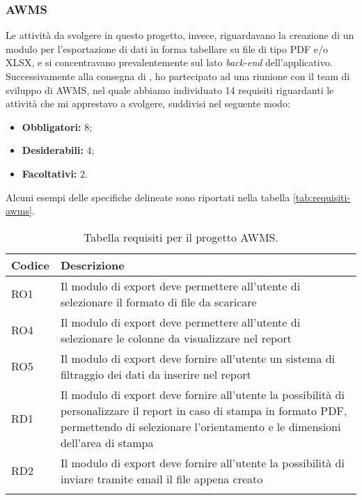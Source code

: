 \subsubsection*{AWMS}
Le attività da svolgere in questo progetto, invece, riguardavano la creazione di un modulo per l'esportazione di dati in forma tabellare su file di tipo PDF e/o XLSX, e si concentravano prevalentemente sul lato \textit{\gls{back-end}} dell'applicativo.
Successivamente alla consegna di \DS{}, ho partecipato ad una riunione con il team di sviluppo di AWMS, nel quale abbiamo individuato 14 requisiti riguardanti le attività che mi apprestavo a svolgere, suddivisi nel seguente modo:
\begin{itemize}
    \item \textbf{Obbligatori:} 8;
    \item \textbf{Desiderabili:} 4;
    \item \textbf{Facoltativi:} 2.
\end{itemize}
Alcuni esempi delle specifiche delineate sono riportati nella tabella \ref{tab:requisiti-awms}.

\begin{center}
	\renewcommand{\arraystretch}{1.5}
	\begin{longtable}{ | p{0.1\linewidth} | p{0.9\linewidth} |}	 
		\hline   
	    \rowcolor{header}\textbf{Codice}&\textbf{Descrizione}\\
		\hline    	
    	RO1 & Il modulo di export deve permettere all'utente di selezionare il formato di file da scaricare  \\
    	RO4 & Il modulo di export deve permettere all'utente di selezionare le colonne da visualizzare nel report \\
        RO5 & Il modulo di export deve fornire all'utente un sistema di filtraggio dei dati da inserire nel report \\
    	RD1 & Il modulo di export deve fornire all'utente la possibilità di personalizzare il report in caso di stampa in formato PDF, permettendo di selezionare l'orientamento e le dimensioni dell'area di stampa\\
    	RD2 & Il modulo di export deve fornire all'utente la possibilità di inviare tramite email il file appena creato\\
    	\hline
		\rowcolor{white}    	
    	\caption{Tabella requisiti per il progetto AWMS.}
	\end{longtable}
	\label{tab:requisiti-awms}
\end{center}

